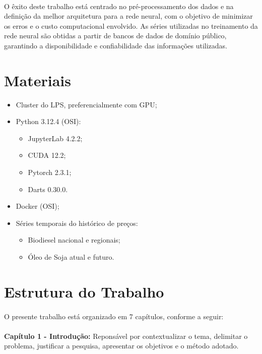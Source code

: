 \paragraph{} O êxito deste trabalho está centrado no pré-processamento dos dados e na definição da melhor arquitetura para a rede neural, com o objetivo de minimizar os erros e o custo computacional envolvido. As séries utilizadas no treinamento da rede neural são obtidas a partir de bancos de dados de domínio público, garantindo a disponibilidade e confiabilidade das informações utilizadas.

\section{Materiais}

\begin{itemize}
	\item Cluster do \ac{LPS}, preferencialmente com \ac{GPU};
	\item Python 3.12.4 (\ac{OSI}): \begin{itemize}
		      \item JupyterLab 4.2.2;
		      \item \ac{CUDA} 12.2;
		      \item Pytorch 2.3.1;
		      \item Darts 0.30.0.
	      \end{itemize}
	\item Docker (\ac{OSI});
	\item Séries temporais do histórico de preços: \begin{itemize}
		      \item Biodiesel nacional e regionais;
		      \item Óleo de Soja atual e futuro.
	      \end{itemize}
\end{itemize}

\section{Estrutura do Trabalho}

\paragraph{} O presente trabalho está organizado em 7 capítulos, conforme a seguir:
\paragraph{} \textbf{Capítulo 1 - Introdução: } Reponsável por contextualizar o tema, delimitar o problema, justificar a pesquisa, apresentar os objetivos e o método adotado.
